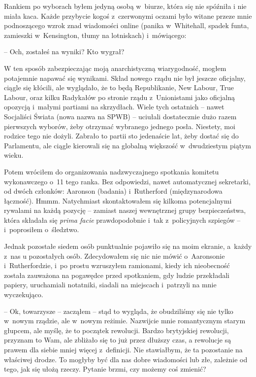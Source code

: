 \documentclass[oneside,polish,11pt,sfheadings]{mwbk}
\let\footnote=\endnote
\begin{document}
Rankiem po wyborach byłem jedyną osobą w~biurze, która się nie spóźniła
i nie miała kaca. Każde przybycie kogoś z~czerwonymi oczami było witane przeze
mnie podnoszącego wzrok znad wiadomości online (panika w~Whitehall,
spadek funta, zamieszki w~Kensington, tłumy na lotniskach) i~mówiącego:

-- Och, zostałeś na wyniki? Kto wygrał?

W ten sposób zabezpieczając moją anarchistyczną wiarygodność, mogłem
potajemnie napawać się wynikami. Skład nowego rządu nie był jeszcze
oficjalny, ciągle się kłócili, ale wyglądało, że to będą Republikanie,
New Labour, True Labour, oraz kilku Radykałów po stronie rządu z~Unionistami jako oficjalną opozycją i~małymi partiami na skrzydłach.
Wiele tych ostatnich -- nawet Socjaliści Świata (nowa nazwa na SPWB) -- uciułali dostatecznie dużo razem pierwszych wyborów, żeby otrzymać
wybranego jednego posła. Niestety, moi rodzice tego nie dożyli. Zabrało
to partii sto jedenaście lat, żeby dostać się do Parlamentu, ale ciągle
kierowali się na globalną większość w~dwudziestym piątym wieku.

Potem wróciłem do organizowania nadzwyczajnego spotkania komitetu
wykonawczego o~11 tego ranka. Bez odpowiedzi, nawet automatycznej
sekretarki, od dwóch członków: Aaronson (badania) i~Rutherford
(międzynarodowa łączność). Hmmm. Natychmiast skontaktowałem się kilkoma
potencjalnymi rywalami na każdą pozycję -- zamiast naszej wewnętrznej
grupy bezpieczeństwa, która składała się \emph{prima facie}\footnote{łac. na
pierwszy rzut oka -- przyp.tłum.} prawdopodobnie i~tak z~policyjnych
szpiegów -- i~poprosiłem o~śledztwo.

Jednak pozostałe siedem osób punktualnie pojawiło się na moim ekranie, a~każdy z~nas u pozostałych osób. Zdecydowałem się nic nie mówić o~Aaronsonie i~Rutherfordzie, i~po prostu wzruszyłem ramionami, kiedy ich
nieobecność została zauważona na pogawędce przed spotkaniem, gdy ludzie
przekładali papiery, uruchamiali notatniki, siadali na miejscach i~patrzyli na mnie wyczekująco.

-- Ok, towarzysze -- zacząłem -- stąd to wygląda, że obudziliśmy się nie
tylko w~nowym rządzie, ale w~nowym reżimie. Nazwijcie mnie romantycznym
starym głupcem, ale myślę, że to początek rewolucji. Bardzo brytyjskiej
rewolucji, przyznam to Wam, ale zbliżało się to już przez dłuższy czas,
a rewolucje są prawem dla siebie mniej więcej z~definicji. Nie
stawiałbym, że ta pozostanie na właściwej drodze. To mogłyby być dla nas
dobre wiadomości lub złe, zależnie od tego, jak się ułożą rzeczy.
Pytanie brzmi, czy możemy coś zmienić?
\end{document}
